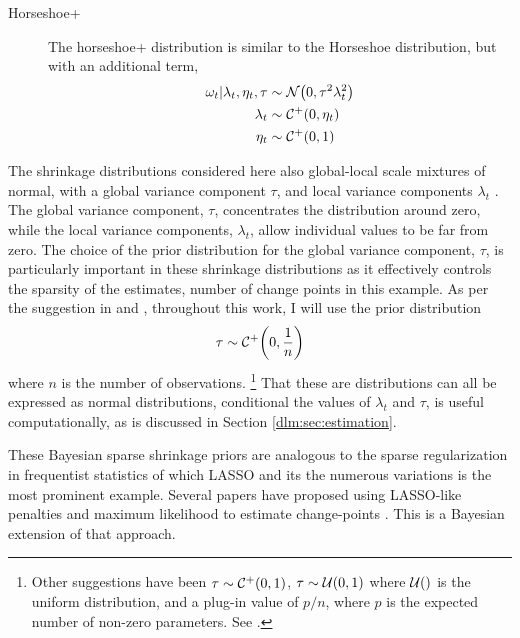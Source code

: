 \begin{description}
\item[Horseshoe+] The horseshoe+ distribution \textcite{BhadraDattaPolsonEtAl2015a} is similar to the Horseshoe distribution, but with an additional term,
\begin{equation}
  \label{dlm:eq:15}
  \begin{aligned}[t]
    \omega_{t} | \lambda_{t}, \eta_{t}, \tau & \sim \mathcal{N}\mathopen{}\left(0, \tau^{2} \lambda_{t}^{2}\right)\mathclose{} \\
    \lambda_{t}  & \sim \mathcal{C^+}\mathopen{}\left(0, \eta_{t}\right)\mathclose{} \\
    \eta_{t} & \sim \mathcal{C^+}\mathopen{}\left(0, 1\right)\mathclose{} \\
  \end{aligned}
\end{equation}
\end{description}

The shrinkage distributions considered here also global-local scale mixtures of normal, with a global variance component $\tau$, and local variance components $\lambda_{t}$ \parencite{PolsonScott2010}.
The global variance component, $\tau$, concentrates the distribution around zero, while the local variance components, $\lambda_{t}$, allow individual values to be far from zero.
The choice of the prior distribution for the global variance component, $\tau$, is particularly important in these shrinkage distributions as it effectively controls the sparsity of the estimates, number of change points in this example.
As per the suggestion in \textcite{BhadraDattaPolsonEtAl2015a} and \textcite{PasKleijnVaart2014a}, throughout this work, I will use the prior distribution
\begin{equation}
  \tau \sim \mathcal{C^+}\mathopen{}\left(0, \frac{1}{n}\right)\mathclose{}
\end{equation}
where $n$ is the number of observations.
\footnote{
  Other suggestions have been $\tau \sim \mathcal{C^+}\mathopen{}\left(0, 1\right)\mathclose{}$, $\tau \sim \mathcal{U}\mathopen{}\left(0, 1\right)\mathclose{}$ where $\mathcal{U}\mathopen{}\left(\right)\mathclose{}$ is the uniform distribution, and a plug-in value of $p / n$, where $p$ is the expected number of non-zero parameters. See \textcites{PolsonScott2012}{PasKleijnVaart2014a}{BhadraDattaPolsonEtAl2015a}.
}
That these are distributions can all be expressed as normal distributions, conditional the values of $\lambda_{t}$ and $\tau$, is useful computationally, as is discussed in Section \ref{dlm:sec:estimation}.

These Bayesian sparse shrinkage priors are analogous to the sparse regularization in frequentist statistics of which LASSO \parencite{Tibshirani1996} and its the numerous variations is the most prominent example.
Several papers have proposed using LASSO-like penalties and maximum likelihood to estimate change-points \parencites{TibshiraniEtAl2005}{HarchaouiLevy-Leduc2010}{ChanYauZhang2014}.
This is a Bayesian extension of that approach.


